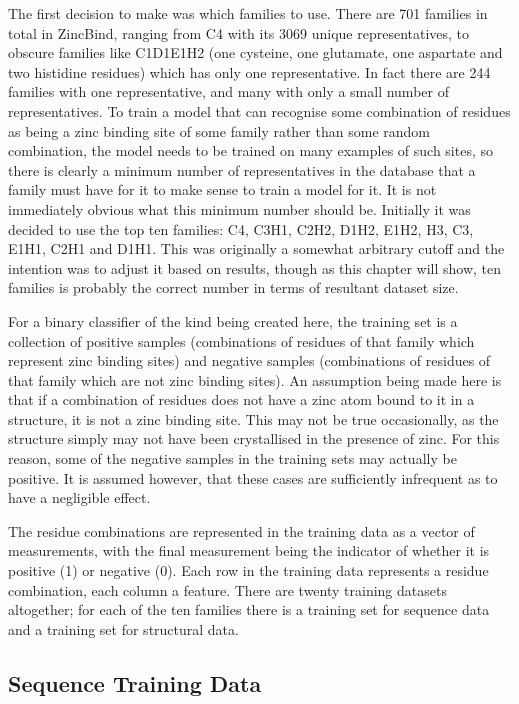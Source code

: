 The first decision to make was which families to use. There are 701 families in total in ZincBind, ranging from C4 with its 3069 unique representatives, to obscure families like C1D1E1H2 (one cysteine, one glutamate, one aspartate and two histidine residues) which has only one representative. In fact there are 244 families with one representative, and many with only a small number of representatives. To train a model that can recognise some combination of residues as being a zinc binding site of some family rather than some random combination, the model needs to be trained on many examples of such sites, so there is clearly a minimum number of representatives in the database that a family must have for it to make sense to train a model for it. It is not immediately obvious what this minimum number should be. Initially it was decided to use the top ten families: C4, C3H1, C2H2, D1H2, E1H2, H3, C3, E1H1, C2H1 and D1H1. This was originally a somewhat arbitrary cutoff and the intention was to adjust it based on results, though as this chapter will show, ten families is probably the correct number in terms of resultant dataset size.

For a binary classifier of the kind being created here, the training set is a collection of positive samples (combinations of residues of that family which represent zinc binding sites) and negative samples (combinations of residues of that family which are not zinc binding sites). An assumption being made here is that if a combination of residues does not have a zinc atom bound to it in a structure, it is not a zinc binding site. This may not be true occasionally, as the structure simply may not have been crystallised in the presence of zinc. For this reason, some of the negative samples in the training sets may actually be positive. It is assumed however, that these cases are sufficiently infrequent as to have a negligible effect.

The residue combinations are represented in the training data as a vector of measurements, with the final measurement being the indicator of whether it is positive (1) or negative (0). Each row in the training data represents a residue combination, each column a feature. There are twenty training datasets altogether; for each of the ten families there is a training set for sequence data and a training set for structural data.

\subsection{Sequence Training Data}

